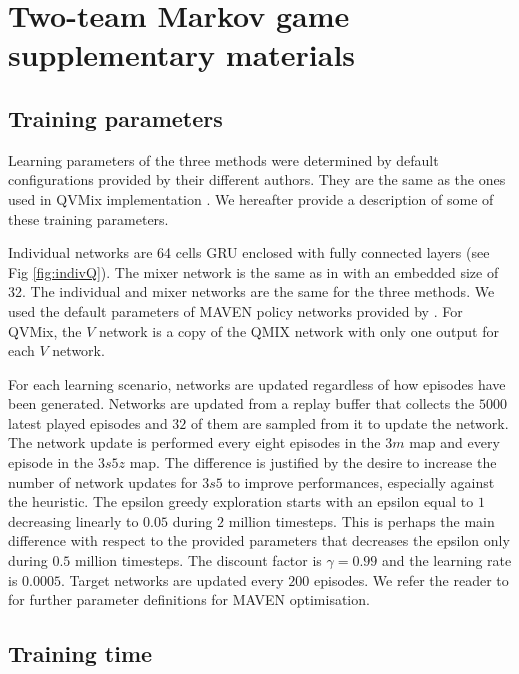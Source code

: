 \chapter{Two-team Markov game supplementary materials} \label{ch:ch7_appendix}
\section{Training parameters}
\label{app:train_param}
Learning parameters of the three methods were determined by default configurations provided by their different authors.
They are the same as the ones used in QVMix implementation \citep{leroy2020qvmix}.
We hereafter provide a description of some of these training parameters.

Individual networks are 64 cells GRU enclosed with fully connected layers (see Fig \ref{fig:indivQ}).
The mixer network is the same as in \citep{Rashid2018} with an embedded size of 32.
The individual and mixer networks are the same for the three methods.
We used the default parameters of MAVEN policy networks provided by \citep{Mahajan2019MAVEN:Exploration}.
For QVMix, the $V$ network is a copy of the QMIX network with only one output for each $V$ network.

For each learning scenario, networks are updated regardless of how episodes have been generated.
Networks are updated from a replay buffer that collects the $5000$ latest played episodes and $32$ of them are sampled from it to update the network.
The network update is performed every eight episodes in the $3m$ map and every episode in the $3s5z$ map.
The difference is justified by the desire to increase the number of network updates for $3s5$ to improve performances, especially against the heuristic.
The epsilon greedy exploration starts with an epsilon equal to $1$ decreasing linearly to $0.05$ during $2$ million timesteps.
This is perhaps the main difference with respect to the provided parameters that decreases the epsilon only during $0.5$ million timesteps.
The discount factor is $\gamma = 0.99$ and the learning rate is $0.0005$.
Target networks are updated every $200$ episodes.
We refer the reader to \citep{Mahajan2019MAVEN:Exploration} for further parameter definitions for MAVEN optimisation.

\section{Training time}
\label{app:train_time}

